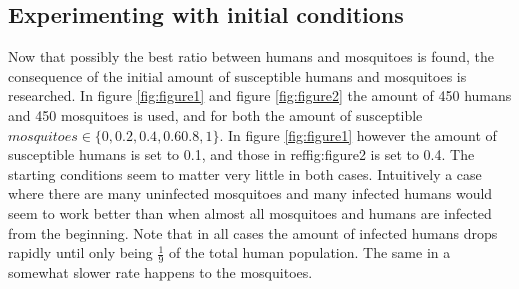 \documentclass[a4paper]{report}
\begin{document}
\subsection{Experimenting with initial conditions}
Now that possibly the best ratio between humans and mosquitoes is found, 
the consequence of the initial amount of susceptible humans and mosquitoes is researched.
In figure \ref{fig:figure1} and figure \ref{fig:figure2} the amount of 450
humans and 450 mosquitoes is used, and for both the amount of susceptible $mosquitoes
\in \{0, 0.2, 0.4, 0.6 0.8, 1\}$. In figure \ref{fig:figure1} however the
amount of susceptible humans is set to 0.1, and those in ref{fig:figure2} is set to
0.4.  The starting conditions seem to matter very little in both cases.
Intuitively a case where there are many uninfected mosquitoes and many infected
humans would seem to work better than when almost all mosquitoes and humans are
infected from the beginning. Note that in all cases the amount
of infected humans drops rapidly until only being $\frac{1}{9}$ of the total
human population. The same in a somewhat slower rate happens to the mosquitoes.
\end{document}
